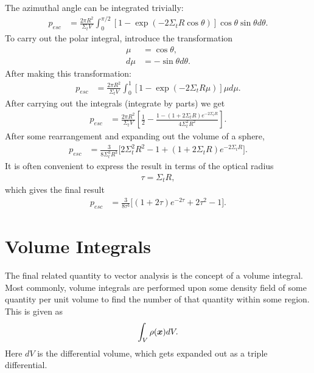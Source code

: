 The azimuthal angle can be integrated trivially:
\begin{align}
  p_{esc} &= \frac{2 \pi R^2}{\Sigma_t V} \int_0^{\pi/2} \left[  1 - \exp \left( -2 \Sigma_t R \cos \theta \right) \right] \cos \theta \sin\theta d\theta .
\end{align}
To carry out the polar integral, introduce the transformation
\begin{subequations}
\begin{align}
   \mu &= \cos \theta , \\
   d\mu &= -\sin \theta d \theta .
\end{align}
\end{subequations}
After making this transformation:
\begin{align}
  p_{esc} &= \frac{2 \pi R^2}{\Sigma_t V} \int_0^1 \left[  1 - \exp \left( -2 \Sigma_t R \mu \right) \right] \mu d \mu .
\end{align}
After carrying out the integrals (integrate by parts) we get
\begin{align}
  p_{esc} &= \frac{2\pi R^2}{\Sigma_t V} \left[  \frac{1}{2} -  \frac{ 1 - ( 1 + 2 \Sigma_t R ) e^{-2 \Sigma_t R}  }{  4 \Sigma_t^2 R^2 } \right] .
\end{align}
After some rearrangement and expanding out the volume of a sphere,
\begin{align}
  p_{esc} &= \frac{3}{8 \Sigma_t^3  R^3} \bigg[  2 \Sigma_t^2 R^2 - 1  + ( 1 + 2 \Sigma_t R ) e^{-2 \Sigma_t R } \bigg] .
\end{align}
It is often convenient to express the result in terms of the optical radius
\begin{align}
  \tau = \Sigma_t R,
\end{align}
which gives the final result
\begin{align}
  p_{esc} &= \frac{3}{8 \tau^3} \bigg[ ( 1 + 2 \tau ) e^{-2\tau} + 2 \tau^2 - 1 \bigg] .
\end{align}


\section{Volume Integrals}

The final related quantity to vector analysis is the concept of a volume integral. Most commonly, volume integrals are performed upon some density field of some quantity per unit volume to find the number of that quantity within some region. This is given as
\begin{align}
  \int_V \rho(\bm{x}) dV .
\end{align}
Here $dV$ is the differential volume, which gets expanded out as a triple differential.


